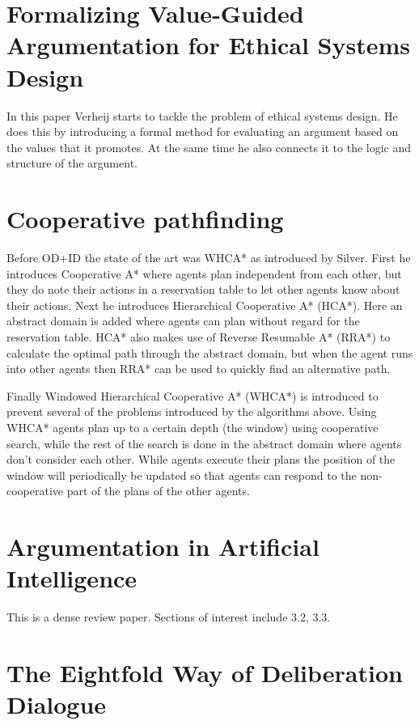 \documentclass[a4paper]{article}
\begin{document}
\section{Formalizing Value-Guided Argumentation for Ethical Systems 
Design\cite{verheij2016}}
In this paper Verheij starts to tackle the problem of ethical systems design. 
He does this by introducing a formal method for evaluating an argument based on 
the values that it promotes. At the same time he also connects it to the logic 
and structure of the argument.

\section{Cooperative pathfinding\cite{silver2005}}
Before OD+ID the state of the art was WHCA* as introduced by Silver. First he 
introduces Cooperative A* where agents plan independent from each other, but 
they do note their actions in a reservation table to let other agents know 
about their actions. Next he introduces Hierarchical Cooperative A* (HCA*). 
Here an abstract domain is added where agents can plan without regard for the 
reservation table. HCA* also makes use of Reverse Resumable A* (RRA*) to 
calculate the optimal path through the abstract domain, but when the agent runs 
into other agents then RRA* can be used to quickly find an alternative path. 

Finally Windowed Hierarchical Cooperative A* (WHCA*) is introduced to prevent 
several of the problems introduced by the algorithms above. Using WHCA* agents 
plan up to a certain depth (the window) using cooperative search, while the 
rest of the search is done in the abstract domain where agents don't consider 
each other. While agents execute their plans the position of the window will 
periodically be updated so that agents can respond to the non-cooperative part 
of the plans of the other agents.

\section{Argumentation in Artificial Intelligence \cite{bench-capon2007}}
This is a dense review paper. Sections of interest include 3.2, 3.3.

\section{The Eightfold Way of Deliberation Dialogue\cite{mcburney2007}}
\end{document}
